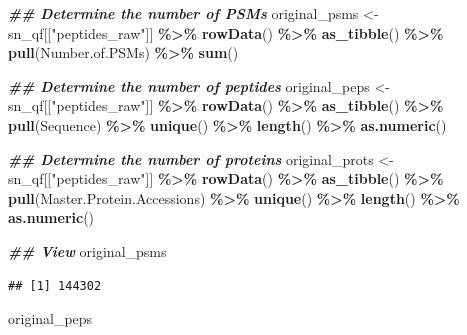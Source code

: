 \documentclass[9pt,a4paper,]{extarticle}
\newenvironment{Shaded}{\begin{snugshade}}{\end{snugshade}}
\newcommand{\DocumentationTok}[1]{\textcolor[rgb]{0.56,0.35,0.01}{\textbf{\textit{#1}}}}
\newcommand{\FunctionTok}[1]{\textcolor[rgb]{0.13,0.29,0.53}{\textbf{#1}}}
\newcommand{\NormalTok}[1]{#1}
\newcommand{\OtherTok}[1]{\textcolor[rgb]{0.56,0.35,0.01}{#1}}
\newcommand{\SpecialCharTok}[1]{\textcolor[rgb]{0.81,0.36,0.00}{\textbf{#1}}}
\newcommand{\StringTok}[1]{\textcolor[rgb]{0.31,0.60,0.02}{#1}}
\begin{document}
\begin{Shaded}
\begin{Highlighting}[]
\DocumentationTok{\#\# Determine the number of PSMs}
\NormalTok{original\_psms }\OtherTok{\textless{}{-}}\NormalTok{ sn\_qf[[}\StringTok{"peptides\_raw"}\NormalTok{]] }\SpecialCharTok{\%\textgreater{}\%} 
  \FunctionTok{rowData}\NormalTok{() }\SpecialCharTok{\%\textgreater{}\%} 
  \FunctionTok{as\_tibble}\NormalTok{() }\SpecialCharTok{\%\textgreater{}\%} 
  \FunctionTok{pull}\NormalTok{(Number.of.PSMs) }\SpecialCharTok{\%\textgreater{}\%} 
  \FunctionTok{sum}\NormalTok{() }

\DocumentationTok{\#\# Determine the number of peptides}
\NormalTok{original\_peps }\OtherTok{\textless{}{-}}\NormalTok{ sn\_qf[[}\StringTok{"peptides\_raw"}\NormalTok{]] }\SpecialCharTok{\%\textgreater{}\%} 
  \FunctionTok{rowData}\NormalTok{() }\SpecialCharTok{\%\textgreater{}\%} 
  \FunctionTok{as\_tibble}\NormalTok{() }\SpecialCharTok{\%\textgreater{}\%} 
  \FunctionTok{pull}\NormalTok{(Sequence) }\SpecialCharTok{\%\textgreater{}\%} 
  \FunctionTok{unique}\NormalTok{() }\SpecialCharTok{\%\textgreater{}\%}
  \FunctionTok{length}\NormalTok{() }\SpecialCharTok{\%\textgreater{}\%}
  \FunctionTok{as.numeric}\NormalTok{() }

\DocumentationTok{\#\# Determine the number of proteins}
\NormalTok{original\_prots }\OtherTok{\textless{}{-}}\NormalTok{ sn\_qf[[}\StringTok{"peptides\_raw"}\NormalTok{]] }\SpecialCharTok{\%\textgreater{}\%}
  \FunctionTok{rowData}\NormalTok{() }\SpecialCharTok{\%\textgreater{}\%} 
  \FunctionTok{as\_tibble}\NormalTok{() }\SpecialCharTok{\%\textgreater{}\%} 
  \FunctionTok{pull}\NormalTok{(Master.Protein.Accessions) }\SpecialCharTok{\%\textgreater{}\%} 
  \FunctionTok{unique}\NormalTok{() }\SpecialCharTok{\%\textgreater{}\%} 
  \FunctionTok{length}\NormalTok{() }\SpecialCharTok{\%\textgreater{}\%}
  \FunctionTok{as.numeric}\NormalTok{()}

\DocumentationTok{\#\# View}
\NormalTok{original\_psms}
\end{Highlighting}
\end{Shaded}

\begin{verbatim}
## [1] 144302
\end{verbatim}

\begin{Shaded}
\begin{Highlighting}[]
\NormalTok{original\_peps}
\end{Highlighting}
\end{Shaded}
\end{document}
